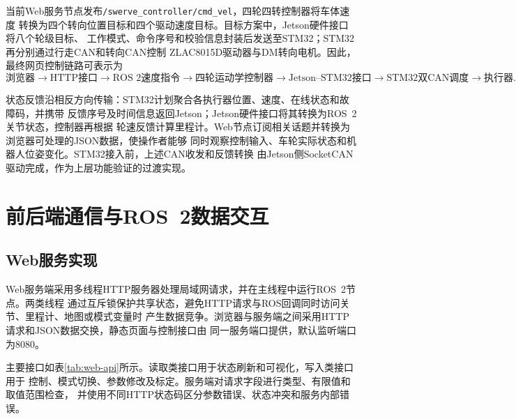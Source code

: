 当前Web服务节点发布\texttt{/swerve\_controller/cmd\_vel}，四轮四转控制器将车体速度
转换为四个转向位置目标和四个驱动速度目标。目标方案中，Jetson硬件接口将八个轮级目标、
工作模式、命令序号和校验信息封装后发送至STM32；STM32再分别通过行走CAN和转向CAN控制
ZLAC8015D驱动器与DM转向电机。因此，最终网页控制链路可表示为
\begin{equation}
\text{浏览器}
\rightarrow \text{HTTP接口}
\rightarrow \text{ROS~2速度指令}
\rightarrow \text{四轮运动学控制器}
\rightarrow \text{Jetson--STM32接口}
\rightarrow \text{STM32双CAN调度}
\rightarrow \text{执行器}.
\label{eq:web-command-chain}
\end{equation}

状态反馈沿相反方向传输：STM32计划聚合各执行器位置、速度、在线状态和故障码，并携带
反馈序号及时间信息返回Jetson；Jetson硬件接口将其转换为ROS~2关节状态，控制器再根据
轮速反馈计算里程计。Web节点订阅相关话题并转换为浏览器可处理的JSON数据，使操作者能够
同时观察控制输入、车轮实际状态和机器人位姿变化。STM32接入前，上述CAN收发和反馈转换
由Jetson侧SocketCAN驱动完成，作为上层功能验证的过渡实现。

\section{前后端通信与ROS~2数据交互}

\subsection{Web服务实现}

Web服务端采用多线程HTTP服务器处理局域网请求，并在主线程中运行ROS~2节点。两类线程
通过互斥锁保护共享状态，避免HTTP请求与ROS回调同时访问关节、里程计、地图或模式变量时
产生数据竞争。浏览器与服务端之间采用HTTP请求和JSON数据交换，静态页面与控制接口由
同一服务端口提供，默认监听端口为8080。

主要接口如表\ref{tab:web-api}所示。读取类接口用于状态刷新和可视化，写入类接口用于
控制、模式切换、参数修改及标定。服务端对请求字段进行类型、有限值和取值范围检查，
并使用不同HTTP状态码区分参数错误、状态冲突和服务内部错误。


